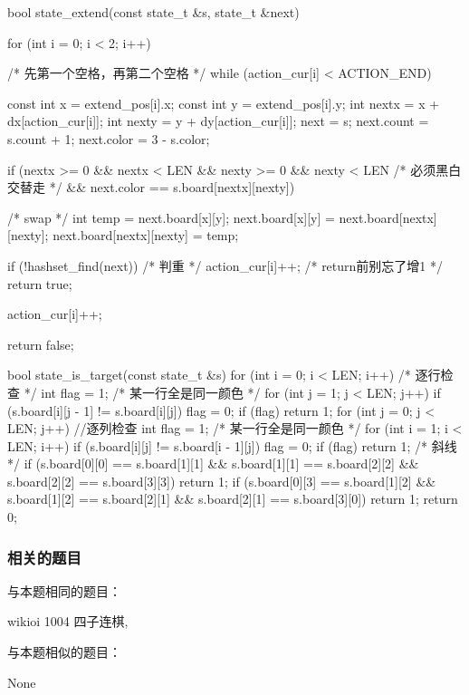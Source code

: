 \begin{Codex}[label=four_adjacent.cpp]
bool state_extend(const state_t &s, state_t &next) {
    for (int i = 0; i < 2; i++) { /* 先第一个空格，再第二个空格 */
        while (action_cur[i] < ACTION_END) {
            const int x = extend_pos[i].x;
            const int y = extend_pos[i].y;
            int nextx = x + dx[action_cur[i]];
            int nexty = y + dy[action_cur[i]];
            next = s;
            next.count = s.count + 1;
            next.color = 3 - s.color;

            if (nextx >= 0 && nextx < LEN && nexty >= 0 && nexty < LEN
                    /* 必须黑白交替走 */
                    && next.color == s.board[nextx][nexty]) {
                /* swap */
                {
                    int temp = next.board[x][y];
                    next.board[x][y] = next.board[nextx][nexty];
                    next.board[nextx][nexty] = temp;
                }

                if (!hashset_find(next)) { /* 判重 */
                    action_cur[i]++; /* return前别忘了增1 */
                    return true;
                }
            }
            action_cur[i]++;
        }
    }
    return false;
}

bool state_is_target(const state_t &s) {
    for (int i = 0; i < LEN; i++) {  /* 逐行检查 */
        int flag = 1;  /* 某一行全是同一颜色 */
        for (int j = 1; j < LEN; j++)
            if (s.board[i][j - 1] != s.board[i][j])
                flag = 0;
        if (flag)
            return 1;
    }
    for (int j = 0; j < LEN; j++) { //逐列检查
        int flag = 1;  /* 某一行全是同一颜色 */
        for (int i = 1; i < LEN; i++)
            if (s.board[i][j] != s.board[i - 1][j]) flag = 0;
        if (flag) return 1;
    }
    /* 斜线 */
    if (s.board[0][0] == s.board[1][1] && s.board[1][1] == s.board[2][2]
            && s.board[2][2] == s.board[3][3])
        return 1;
    if (s.board[0][3] == s.board[1][2] && s.board[1][2] == s.board[2][1]
            && s.board[2][1] == s.board[3][0])
        return 1;
    return 0;
}
\end{Codex}

\subsubsection{相关的题目}
与本题相同的题目：
\begindot
\item  wikioi 1004 四子连棋, 
\myenddot

与本题相似的题目：
\begindot
\item  None
\myenddot


